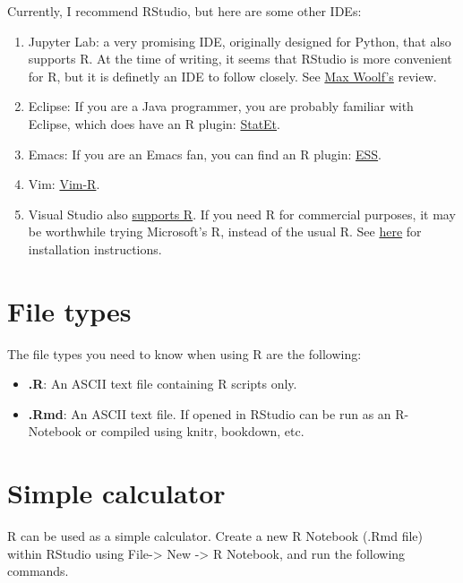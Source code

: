 \documentclass[]{book}
\providecommand{\tightlist}{%
  \setlength{\itemsep}{0pt}\setlength{\parskip}{0pt}}
\theoremstyle{definition}
\theoremstyle{definition}
\theoremstyle{definition}
\theoremstyle{remark}
\begin{document}
Currently, I recommend RStudio, but here are some other IDEs:

\begin{enumerate}
\def\labelenumi{\arabic{enumi}.}
\item
  Jupyter Lab: a very promising IDE, originally designed for Python,
  that also supports R. At the time of writing, it seems that RStudio is
  more convenient for R, but it is definetly an IDE to follow closely.
  See \href{http://minimaxir.com/2017/06/r-notebooks/}{Max Woolf's}
  review.
\item
  Eclipse: If you are a Java programmer, you are probably familiar with
  Eclipse, which does have an R plugin:
  \href{http://www.walware.de/goto/statet}{StatEt}.
\item
  Emacs: If you are an Emacs fan, you can find an R plugin:
  \href{http://ess.r-project.org/}{ESS}.
\item
  Vim: \href{https://github.com/vim-scripts/Vim-R-plugin}{Vim-R}.
\item
  Visual Studio also
  \href{https://www.visualstudio.com/vs/features/rtvs/}{supports R}. If
  you need R for commercial purposes, it may be worthwhile trying
  Microsoft's R, instead of the usual R. See
  \href{https://mran.microsoft.com/documents/rro/installation}{here} for
  installation instructions.
\end{enumerate}

\section{File types}\label{file-types}

The file types you need to know when using R are the following:

\begin{itemize}
\tightlist
\item
  \textbf{.R}: An ASCII text file containing R scripts only.
\item
  \textbf{.Rmd}: An ASCII text file. If opened in RStudio can be run as
  an R-Notebook or compiled using knitr, bookdown, etc.
\end{itemize}

\section{Simple calculator}\label{simple-calculator}

R can be used as a simple calculator. Create a new R Notebook (.Rmd
file) within RStudio using File-\textgreater{} New -\textgreater{} R
Notebook, and run the following commands.
\end{document}
